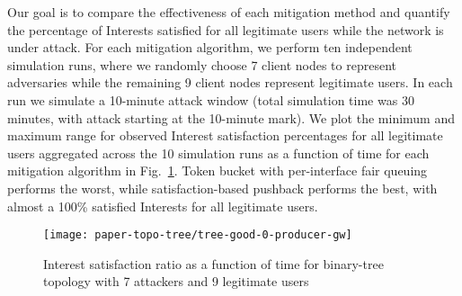 Our goal is to compare the effectiveness of each mitigation method and quantify the percentage of Interests satisfied for all legitimate users while the network is under attack. For each mitigation algorithm, we perform ten independent simulation runs, where we randomly choose 7 client nodes to represent adversaries while the remaining 9 client nodes represent legitimate users. In each run we simulate a 10-minute attack window (total simulation time was 30 minutes, with attack starting at the 10-minute mark). We plot the minimum and maximum range for observed Interest satisfaction percentages for all legitimate users aggregated across the 10 simulation runs as a function of time for each mitigation algorithm in Fig.~\ref{fig:small-scale attack progress}. Token bucket with per-interface fair queuing performs the worst, while satisfaction-based pushback performs the best, with almost a 100\%  satisfied Interests for all legitimate users.


\begin{figure}[]
  \centering
  \vspace{-.2cm}\hspace{-0.8cm}\texttt{[image: paper-topo-tree/tree-good-0-producer-gw]}
  \vspace{-.5cm}\caption{Interest satisfaction ratio as a function of time for binary-tree topology with 7 attackers and 9 legitimate users}
  \label{fig:small-scale attack progress}
\vspace{-.5cm}
\end{figure}



